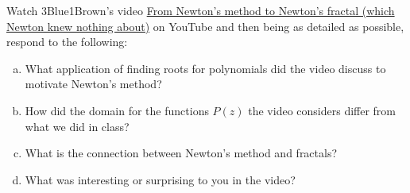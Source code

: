 \documentclass[11pt,letterpaper]{article}
\begin{document}
%	
%
	


 \newpage



 Watch 3Blue1Brown's video \href{https://www.youtube.com/watch?v=-RdOwhmqP5s}{From Newton’s method to Newton’s fractal (which Newton knew nothing about)} on YouTube and then being as detailed as possible, respond to the following:
	\begin{enumerate}[(a)]
	\item What application of finding roots for polynomials did the video discuss to motivate Newton's method?
	\item How did the domain for the functions $P(z)$ the video considers differ from what we did in class?
	\item What is the connection between Newton's method and fractals?
	\item What was interesting or surprising to you in the video?
	\end{enumerate}
\end{document}
